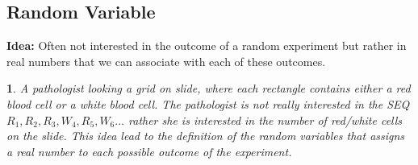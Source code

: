 \documentclass[11pt]{article}
\newtheorem{example}{\framebox{Ex}}[section]
\begin{document}
        \subsection{Random Variable}
            \textbf{Idea:} Often not interested in the outcome of a random experiment but rather in real numbers
                            that we can associate with each of these outcomes.
            \begin{example}
                A pathologist looking a grid on slide, where each rectangle contains either a red blood cell or a white blood cell. 
                The pathologist is not really interested in the SEQ $R_1, R_2, R_3, W_4, R_5, W_6 ...$ 
                rather she is interested in the number of red/white cells on the slide. 
                This idea lead to the definition of the random variables that assigns a real number to each possible outcome of the experiment.
            \end{example}
\end{document}
